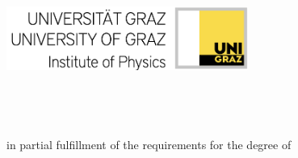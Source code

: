 \begin{titlepage}
	\tgherosfont
	
    \flushright
	
	\includegraphics[height=21mm]{KFU_Physics.png} \\[2mm]
	


    \centering
	\vfill
	{\large {\thesisSubject}} \\[5mm]
	{\LARGE \color{ctcolortitle}\textbf{\thesisTitle} \\[2mm]}
	{\Large \color{ctcolorgray}%
	\textbf{\thesisSubtitle}\\[15mm]}
	{\Large \thesisName} \\ [5mm]
	    
    {in partial fulfillment of the requirements for the degree of} \\
    {\large {{\thesisDegree}}} 

	\vfill
	\begin{minipage}[t]{.27\textwidth}
		\raggedleft
	\end{minipage}
	\hspace*{15pt}
	\begin{minipage}[t]{.65\textwidth}
		\thesisFirstSupervisor\ \\ \thesisSecondSupervisor
	\end{minipage} \\[10mm]

	\thesisDate \\

\end{titlepage}